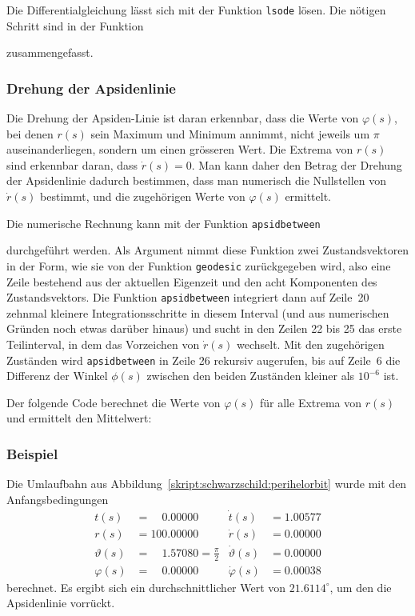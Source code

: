 Die Differentialgleichung lässt sich mit der Funktion \texttt{lsode}
lösen.
Die nötigen Schritt sind in der Funktion

zusammengefasst.

\subsubsection{Drehung der Apsidenlinie}
Die Drehung der Apsiden-Linie ist daran erkennbar, dass die Werte von
$\varphi(s)$, bei denen $r(s)$ sein Maximum und Minimum annimmt,
nicht jeweils um $\pi$ auseinanderliegen, sondern um einen grösseren
Wert.
Die Extrema von $r(s)$ sind erkennbar daran, dass $\dot r(s)=0$.
Man kann daher den Betrag der Drehung der Apsidenlinie dadurch
bestimmen, dass man numerisch die Nullstellen von $\dot r(s)$
bestimmt, und die zugehörigen Werte von $\varphi(s)$ ermittelt.

Die numerische Rechnung kann mit der Funktion \texttt{apsidbetween}

durchgeführt werden.
Als Argument nimmt diese Funktion zwei Zustandsvektoren in der Form,
wie sie von der Funktion \texttt{geodesic}
zurückgegeben wird, also eine Zeile bestehend aus der aktuellen
Eigenzeit und den acht Komponenten des Zustandsvektors.
Die Funktion \texttt{apsidbetween} integriert dann auf Zeile~20
zehnmal kleinere Integrationsschritte in diesem Interval (und aus numerischen
Gründen noch etwas darüber hinaus) und sucht in den Zeilen 22 bis 25
das
erste Teilinterval, in dem das Vorzeichen von $\dot r(s)$ wechselt.
Mit den zugehörigen Zuständen wird \texttt{apsidbetween}
in Zeile 26
rekursiv augerufen, bis auf Zeile~6 die Differenz der Winkel $\phi(s)$ zwischen
den beiden Zuständen kleiner als $10^{-6}$ ist.

Der folgende Code berechnet die Werte von $\varphi(s)$ für alle
Extrema von $r(s)$ und ermittelt den Mittelwert:


\subsubsection{Beispiel}
Die Umlaufbahn aus Abbildung~\ref{skript:schwarzschild:perihelorbit}
wurde mit den Anfangsbedingungen
\begin{equation}
\begin{aligned}
t(s)        &=\phantom{00}0.00000                    &\dot t(s)         &= 1.00577\\
r(s)        &=          100.00000                    &\dot r(s)         &= 0.00000\\
\vartheta(s)&=\phantom{00}1.57080=\textstyle\frac\pi2&\dot \vartheta(s) &= 0.00000\\
\varphi(s)  &=\phantom{00}0.00000                    &\dot \varphi(s)   &= 0.00038
\end{aligned}
\label{skript:schwarzschild:anfangsbedingung:normal}
\end{equation}
berechnet.
Es ergibt sich ein durchschnittlicher Wert von $21.6114^\circ$, um den die
Apsidenlinie vorrückt.


